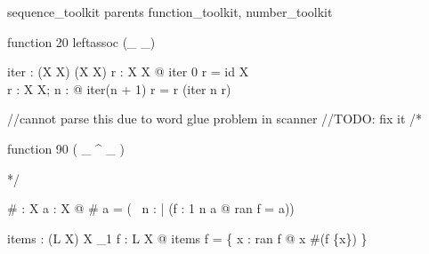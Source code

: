 \zsection sequence\_toolkit parents function\_toolkit, number\_toolkit\\

\begin{zed}
  function 20 leftassoc (\_ \upto \_)
\end{zed}


\begin{gendef}[X]
  iter : \nat \fun (X \rel X) \fun (X \rel X)
\where
  \forall r : X \rel X @ iter 0 r = id X\\
  \forall r : X \rel X; n : \nat @ iter(n + 1) r = r \comp (iter n r)
\end{gendef}

//cannot parse this due to word glue problem in scanner
//TODO: fix it
/*
\begin{zed}
  function 90 ( \_ ^{ \_ } )
\end{zed}

*/

\begin{gendef}[X]
  \# : \finset X \fun \nat
\where
  \forall a : \finset X @ \# a = 
     (\mu~ n : \nat | (\exists f : 1 \upto n \mapsto a @ ran f = a))
\end{gendef}



\begin{gendef}[L,X]
  items : (L \ffun X) \fun X \pfun \nat_1
\where
  \forall f : L \ffun X @
     items f = \{ x : ran f @ x \mapsto \#(f \rres \{x\}) \}
\end{gendef}

